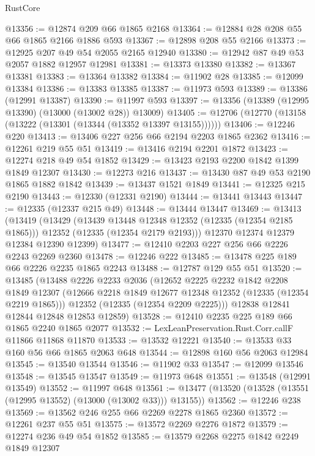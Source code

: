 \begin{lexlean}{RustCore}
\begin{coremodule}
@13356 := @12874 @209 @66 @1865 @2168
@13364 := @12884 @28 @208 @55 @66 @1865 @2166 @1886 @593
@13367 := @12898 @208 @55 @2166
@13373 := @12925 @207 @49 @54 @2055 @2165 @12940
@13380 := @12942 @87 @49 @53 @2057 @1882 @12957 @12981
@13381 := @13373 @13380
@13382 := @13367 @13381
@13383 := @13364 @13382
@13384 := @11902 @28
@13385 := @12099 @13384
@13386 := @13383 @13385
@13387 := @11973 @593
@13389 := @13386 (@12991 @13387)
@13390 := @11997 @593
@13397 := @13356 (@13389 (@12995 @13390) (@13000 (@13002 @28)) @13009)
@13405 := @12706 (@12770 (@13158 (@13222 (@13301 (@13344 (@13352 @13397 @13155))))))
@13406 := @12246 @220
@13413 := @13406 @227 @256 @66 @2194 @2203 @1865 @2362
@13416 := @12261 @219 @55 @51
@13419 := @13416 @2194 @2201 @1872
@13423 := @12274 @218 @49 @54 @1852
@13429 := @13423 @2193 @2200 @1842 @1399 @1849 @12307
@13430 := @12273 @216
@13437 := @13430 @87 @49 @53 @2190 @1865 @1882 @1842
@13439 := @13437 @1521 @1849
@13441 := @12325 @215 @2190
@13443 := @12330 (@12331 @2190)
@13444 := @13441 @13443
@13447 := @12335 (@12337 @215 @49)
@13448 := @13444 @13447
@13469 := @13413
    (@13419
      (@13429
        (@13439 @13448 @12348 @12352 (@12335 (@12354 @2185 @1865)))
        @12352
        (@12335 (@12354 @2179 @2193)))
      @12370
      @12374
      @12379
      @12384
      @12390
      @12399)
@13477 := @12410 @2203 @227 @256 @66 @2226 @2243 @2269 @2360
@13478 := @12246 @222
@13485 := @13478 @225 @189 @66 @2226 @2235 @1865 @2243
@13488 := @12787 @129 @55 @51
@13520 := @13485
    (@13488
      @2226
      @2233
      @2036
      (@12652
        @2225
        @2232
        @1842
        @2208
        @1849
        @12307
        (@12666 @2218 @1849 @12677 @12348 @12352 (@12335 (@12354 @2219 @1865)))
        @12352
        (@12335 (@12354 @2209 @2225)))
      @12838
      @12841
      @12844
      @12848
      @12853
      @12859)
@13528 := @12410 @2235 @225 @189 @66 @1865 @2240 @1865 @2077
@13532 := LexLeanPreservation.Rust.Corr.callF @11866 @11868 @11870
@13533 := @13532 @12221
@13540 := @13533 @33 @160 @56 @66 @1865 @2063 @648
@13544 := @12898 @160 @56 @2063 @12984
@13545 := @13540 @13544
@13546 := @11902 @33
@13547 := @12099 @13546
@13548 := @13545 @13547
@13549 := @11973 @648
@13551 := @13548 (@12991 @13549)
@13552 := @11997 @648
@13561 := @13477 (@13520 (@13528 (@13551 (@12995 @13552) (@13000 (@13002 @33))) @13155))
@13562 := @12246 @238
@13569 := @13562 @246 @255 @66 @2269 @2278 @1865 @2360
@13572 := @12261 @237 @55 @51
@13575 := @13572 @2269 @2276 @1872
@13579 := @12274 @236 @49 @54 @1852
@13585 := @13579 @2268 @2275 @1842 @2249 @1849 @12307

\end{coremodule}
\end{lexlean}
